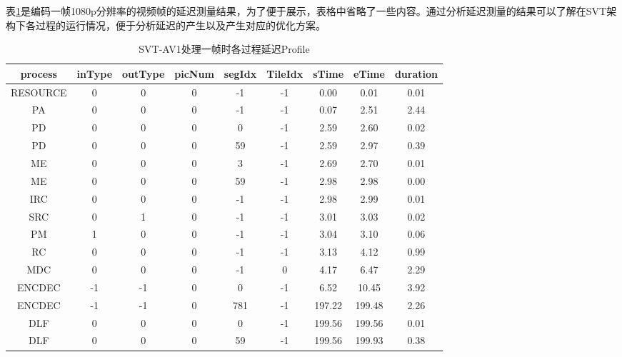   表\ref{tab:svt-profile}是编码一帧1080p分辨率的视频帧的延迟测量结果，为了便于展示，表格中省略了一些内容。通过分析延迟测量的结果可以了解在SVT架构下各过程的运行情况，便于分析延迟的产生以及产生对应的优化方案。

  \begin{table}[htbp]
    \renewcommand{\arraystretch}{0.8} %
    \caption{SVT-AV1处理一帧时各过程延迟Profile}
    \label{tab:svt-profile}
    \centering
    \begin{tabular}{ccccccccc}
    	\toprule
    	process  & inType & outType & picNum & segIdx & TileIdx & sTime  & eTime  & duration \\ \midrule
    	RESOURCE &   0    &    0    &   0    &   -1   &   -1    &  0.00  &  0.01  &   0.01   \\
    	   PA    &   0    &    0    &   0    &   -1   &   -1    &  0.07  &  2.51  &   2.44   \\
    	   PD    &   0    &    0    &   0    &   0    &   -1    &  2.59  &  2.60  &   0.02   \\
    	   PD    &   0    &    0    &   0    &   59   &   -1    &  2.59  &  2.97  &   0.39   \\
    	   ME    &   0    &    0    &   0    &   3    &   -1    &  2.69  &  2.70  &   0.01   \\
    	   ME    &   0    &    0    &   0    &   59   &   -1    &  2.98  &  2.98  &   0.00   \\
    	  IRC    &   0    &    0    &   0    &   -1   &   -1    &  2.98  &  2.99  &   0.01   \\
    	  SRC    &   0    &    1    &   0    &   -1   &   -1    &  3.01  &  3.03  &   0.02   \\
    	   PM    &   1    &    0    &   0    &   -1   &   -1    &  3.04  &  3.10  &   0.06   \\
    	   RC    &   0    &    0    &   0    &   -1   &   -1    &  3.13  &  4.12  &   0.99   \\
    	  MDC    &   0    &    0    &   0    &   -1   &    0    &  4.17  &  6.47  &   2.29   \\
    	 ENCDEC  &   -1   &   -1    &   0    &   0    &   -1    &  6.52  & 10.45  &   3.92   \\
    	 ENCDEC  &   -1   &   -1    &   0    &  781   &   -1    & 197.22 & 199.48 &   2.26   \\
    	  DLF    &   0    &    0    &   0    &   0    &   -1    & 199.56 & 199.56 &   0.01   \\
    	  DLF    &   0    &    0    &   0    &   59   &   -1    & 199.56 & 199.93 &   0.38   \\

\end{tabular}
\end{table}
